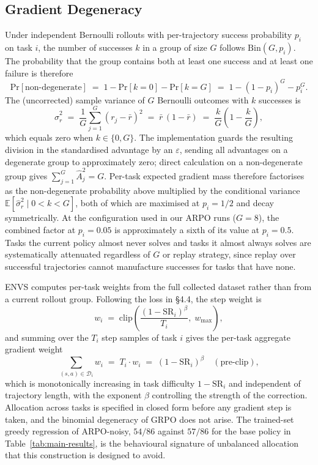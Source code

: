 \documentclass[11pt]{article}
\begin{document}
\subsection{Gradient Degeneracy}
\label{app:rl:gradient}

Under independent Bernoulli rollouts with per-trajectory success
probability $p_i$ on task $i$, the number of successes $k$ in a group of
size $G$ follows $\mathrm{Bin}(G, p_i)$. The probability that the group
contains both at least one success and at least one failure is therefore
\[
    \mathrm{Pr}[\text{non-degenerate}]
    \;=\; 1 - \mathrm{Pr}[k = 0] - \mathrm{Pr}[k = G]
    \;=\; 1 - (1-p_i)^G - p_i^G.
\]
The (uncorrected) sample variance of $G$ Bernoulli outcomes with $k$
successes is
\[
    \hat\sigma_r^2 \;=\; \frac{1}{G}\sum_{j=1}^{G} (r_j - \bar r)^2
    \;=\; \bar r\,(1 - \bar r)
    \;=\; \frac{k}{G}\!\left(1 - \frac{k}{G}\right),
\]
which equals zero when $k \in \{0, G\}$. The implementation guards the
resulting division in the standardised advantage by an $\varepsilon$,
sending all advantages on a degenerate group to approximately zero;
direct calculation on a non-degenerate group gives $\sum_{j=1}^G \hat
A_j^2 = G$. Per-task expected gradient mass therefore factorises as the
non-degenerate probability above multiplied by the conditional variance
$\mathbb{E}[\hat\sigma_r^2 \mid 0 < k < G]$, both of which are maximised
at $p_i = 1/2$ and decay symmetrically. At the configuration used in our
ARPO runs ($G = 8$), the combined factor at $p_i = 0.05$ is approximately
a sixth of its value at $p_i = 0.5$. Tasks the current policy almost
never solves and tasks it almost always solves are systematically
attenuated regardless of $G$ or replay strategy, since replay over
successful trajectories cannot manufacture successes for tasks that have
none.

\textsc{ENVS} computes per-task weights from the full collected dataset
rather than from a current rollout group. Following the loss in \S4.4,
the step weight is
\[
    w_i
    \;=\;
    \mathrm{clip}\!\left(
        \frac{(1 - \mathrm{SR}_i)^{\beta}}{T_i},\; w_{\max}
    \right),
\]
and summing over the $T_i$ step samples of task $i$ gives the per-task
aggregate gradient weight
\[
    \sum_{(s, a) \in \mathcal{D}_i} w_i
    \;=\; T_i \cdot w_i
    \;=\; (1 - \mathrm{SR}_i)^{\beta}
    \quad (\text{pre-clip}),
\]
which is monotonically increasing in task difficulty $1 - \mathrm{SR}_i$
and independent of trajectory length, with the exponent $\beta$
controlling the strength of the correction. Allocation across tasks is
specified in closed form before any gradient step is taken, and the
binomial degeneracy of GRPO does not arise. The trained-set greedy
regression of ARPO-noisy, $54/86$ against $57/86$ for the base policy in
Table~\ref{tab:main-results}, is the behavioural signature of unbalanced
allocation that this construction is designed to avoid.
\end{document}
